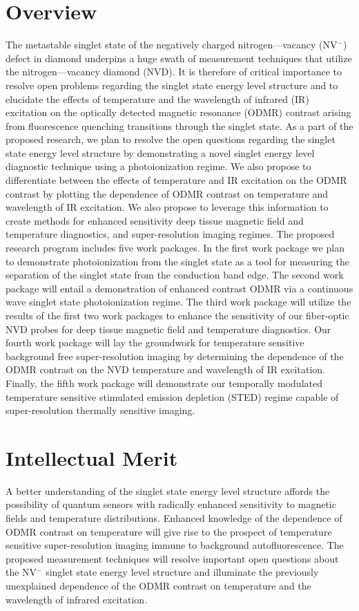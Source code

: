 \documentclass[11pt]{article}
\begin{document}
\section{Overview}
The metastable singlet state of the negatively charged nitrogen—vacancy (NV$^-$) defect in diamond underpins a huge swath of measurement techniques that utilize the nitrogen—vacancy diamond (NVD).  It is therefore of critical importance to resolve open problems regarding the singlet state energy level structure and to elucidate the effects of temperature and the wavelength of infrared (IR) excitation on the optically detected magnetic resonance (ODMR) contrast arising from fluorescence quenching transitions through the singlet state.  As a part of the proposed research, we plan to resolve the open questions regarding the singlet state energy level structure by demonstrating a novel singlet energy level diagnostic technique using a photoionization regime.  We also propose to differentiate between the effects of temperature and IR excitation on the ODMR contrast by plotting the dependence of ODMR contrast on temperature and wavelength of IR excitation.  We also propose to leverage this information to create methods for enhanced sensitivity deep tissue magnetic field and temperature diagnostics, and super-resolution imaging regimes.  The proposed research program includes five work packages.  In the first work package we plan to demonstrate photoionization from the singlet state as a tool for measuring the separation of the singlet state from the conduction band edge.  The second work package will entail a demonstration of enhanced contrast ODMR via a continuous wave singlet state photoionization regime.  The third work package will utilize the results of the first two work packages to enhance the sensitivity of our fiber-optic NVD probes for deep tissue magnetic field and temperature diagnostics.  Our fourth work package will lay the groundwork for temperature sensitive background free super-resolution imaging by determining the dependence of the ODMR contrast on the NVD temperature and wavelength of IR excitation.  Finally, the fifth work package will demonstrate our temporally modulated temperature sensitive stimulated emission depletion (STED) regime capable of super-resolution thermally sensitive imaging.

\section{Intellectual Merit}
A better understanding of the singlet state energy level structure affords the possibility of quantum sensors with radically enhanced sensitivity to magnetic fields and temperature distributions.  Enhanced knowledge of the dependence of ODMR contrast on temperature will give rise to the prospect of temperature sensitive super-resolution imaging immune to background autofluorescence.  The proposed measurement techniques will resolve important open questions about the NV$^-$ singlet state energy level structure and illuminate the previously unexplained dependence of the ODMR contrast on temperature and the wavelength of infrared excitation.
\end{document}
